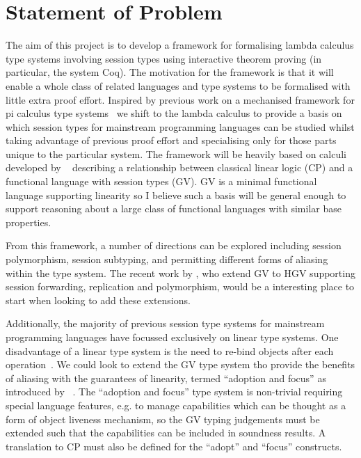 \documentclass{mprop}
\begin{document}
\section{Statement of Problem}

The aim of this project is to develop a framework for formalising lambda
calculus type systems involving session types using interactive theorem
proving (in particular, the system Coq). The motivation for the framework is
that it will enable a whole class of related languages and type systems to be
formalised with little extra proof effort. Inspired by previous work on a
mechanised framework for pi calculus type systems~\cite{Gay:2001:FFP} we
shift to the lambda calculus to provide a basis on which session types for
mainstream programming languages can be studied whilst taking advantage of
previous proof effort and specialising only for those parts unique to the
particular system. The framework will be heavily based on calculi developed by \citeauthor{Wadler:2012}~\cite{Wadler:2012} describing a relationship between classical linear logic (CP) and a functional language with session types (GV). GV is a minimal functional language supporting linearity so I believe such a basis will be general enough to support reasoning about a large class of functional languages with similar base properties.

From this framework, a number of directions can be explored including
session polymorphism, session subtyping, and permitting different forms of
aliasing within the type system. The recent work by \citeauthor{Lindley:2014:SAP} \cite{Lindley:2014:SAP}, who extend GV to HGV supporting session forwarding, replication and polymorphism, would be a interesting place to start when looking to add these extensions.

Additionally, the majority of previous session type systems for mainstream programming languages have focussed exclusively on linear type systems. One disadvantage of a linear type system is the need to re-bind objects after each operation~\cite{Gay:2010:LAST}. We could look to extend the GV type system tho provide the benefits of aliasing with the guarantees of linearity, termed ``adoption and focus'' as introduced by~\citeauthor{Fahndrich:2002} \cite{Fahndrich:2002}. The ``adoption and focus'' type system is non-trivial requiring special language features, e.g. to manage capabilities which can be thought as a form of object liveness mechanism, so the GV typing judgements must be extended such that the capabilities can be included in soundness results. A translation to CP must also be defined for the ``adopt'' and ``focus'' constructs.
\end{document}
